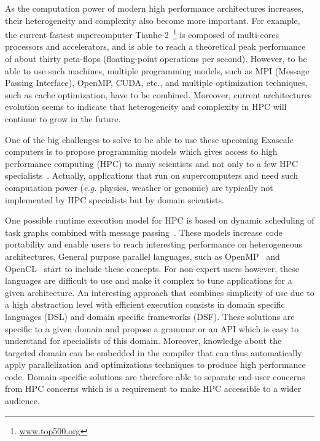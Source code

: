 As the computation power of modern high performance architectures increases, their heterogeneity and complexity also become more important. For example, the current fastest supercomputer Tianhe-2~\footnote{\url{www.top500.org}} is composed of multi-cores processors and accelerators, and is able to reach a theoretical peak performance of about thirty peta-flops (floating-point operations per second). However, to be able to use such machines, multiple programming models, such as MPI (Message Passing Interface), OpenMP, CUDA, etc., and multiple optimization techniques, such as cache optimization, have to be combined. Moreover, current architectures evolution seems to indicate that heterogeneity and complexity in HPC will continue to grow in the future.

One of the big challenges to solve to be able to use these upcoming Exascale computers is to propose programming models which gives access to high performance computing (HPC) to many scientists and not only to a few HPC specialists~\cite{ETP4HPC2013}. Actually, applications that run on supercomputers and need such computation power (\textit{e.g.} physics, weather or genomic) are typically not implemented by HPC specialists but by domain scientists.

One possible runtime execution model for HPC is based on dynamic scheduling of task graphs combined with message passing~\cite{Gautier:2013:XRS:2510661.2511383,Augonnet2011,wu:hal-01078359}.
These models increase code portability and enable users to reach interesting performance on heterogeneous architectures.
General purpose parallel languages, such as OpenMP~\cite{660313} and OpenCL~\cite{Stone:2010:OPP:622179.1803953} start to include these concepts.
For non-expert users however, these languages are difficult to use and make it complex to tune applications for a given architecture. 
An interesting approach that combines simplicity of use due to a high abstraction level with efficient execution consists in domain specific languages (DSL) and domain specific frameworks (DSF).
These solutions are specific to a given domain and propose a grammar or an API which is easy to understand for specialists of this domain.
Moreover, knowledge about the targeted domain can be embedded in the compiler that can thus automatically apply parallelization and optimizations techniques to produce high performance code.
Domain specific solutions are therefore able to separate end-user concerns from HPC concerns which is a requirement to make HPC accessible to a wider audience.

